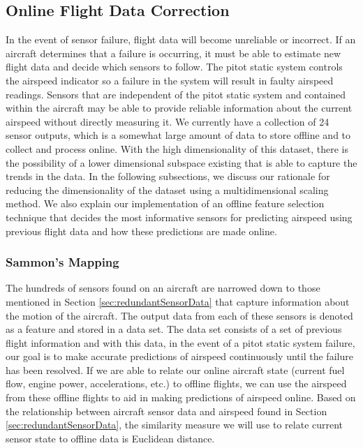 \documentclass[]{aiaa-tc}
\begin{document}
\subsection{Online Flight Data Correction}
\label{sec:flight correction}
In the event of sensor failure, flight data will become unreliable or incorrect. If an aircraft determines that a failure is occurring, it must be able to estimate new flight data and decide which sensors to follow. The pitot static system controls the airspeed indicator so a failure in the system will result in faulty airspeed readings. Sensors that are independent of the pitot static system and contained within the aircraft may be able to provide reliable information about the current airspeed without directly measuring it. We currently have a collection of 24 sensor outputs, which is a somewhat large amount of data to store offline and to collect and process online. With the high dimensionality of this dataset, there is the possibility of a lower dimensional subspace existing that is able to capture the trends in the data. In the following subsections, we discuss our rationale for reducing the dimensionality of the dataset using a multidimensional scaling method. We also explain our implementation of an offline feature selection technique that decides the most informative sensors for predicting airspeed using previous flight data and how these predictions are made online. 



\subsubsection{Sammon's Mapping }
The hundreds of sensors found on an aircraft are narrowed down to those mentioned in Section \ref{sec:redundantSensorData} that capture information about the motion of the aircraft. The output data from each of these sensors is denoted as a feature and stored in a data set. The data set consists of a set of previous flight information and with this data, in the event of a pitot static system failure, our goal is to make accurate predictions of airspeed continuously until the failure has been resolved. If we are able to relate our online aircraft state (current fuel flow, engine power, accelerations, etc.) to offline flights, we can use the airspeed from these offline flights to aid in making predictions of airspeed online. Based on the relationship between aircraft sensor data and airspeed found in Section \ref{sec:redundantSensorData}, the similarity measure we will use to relate current sensor state to offline data is Euclidean distance. 
\end{document}
